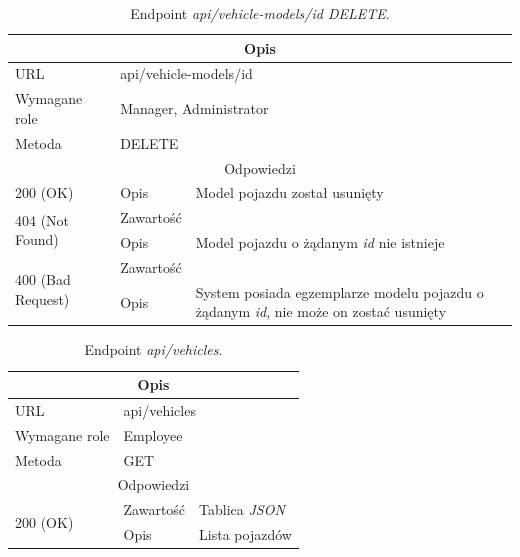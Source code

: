 \documentclass[eng,printmode,openany]{mgr}
\begin{document}
	\begin{table}[H]
		\caption{Endpoint \textit{api/vehicle-models/id DELETE}.}
		\begin{tabularx}{\textwidth}{|l|l|X|}
			\hline
			\multicolumn{3}{|c|}{Opis}
			\\ \hline
			URL                       & \multicolumn{2}{l|}{api/vehicle-models/id}
			\\ \hline
			Wymagane role             & \multicolumn{2}{l|}{Manager, Administrator}
			\\ \hline
			Metoda                    & \multicolumn{2}{l|}{DELETE}
			\\ \hline
			\multicolumn{3}{|c|}{Odpowiedzi}
			\\ \hline
			200 (OK)			                & Opis         	& Model pojazdu został usunięty
			\\ \hline
			\multirow{2}{*}{404 (Not Found)} 	& Zawartość     &    	
			\\ \cline{2-3}                      & Opis          & Model pojazdu o żądanym \textit{id} nie istnieje
			\\ \hline
			\multirow{2}{*}{400 (Bad Request)} 	& Zawartość     &    	
			\\ \cline{2-3}                      & Opis          & System posiada egzemplarze modelu pojazdu o żądanym \textit{id}, nie może on zostać usunięty
			\\ \hline
		\end{tabularx}
	\end{table}
	
	\newpage
	\begin{table}[H]
		\caption{Endpoint \textit{api/vehicles}.}
		\begin{tabularx}{\textwidth}{|l|l|X|}
			\hline
			\multicolumn{3}{|c|}{Opis}
			\\ \hline
			URL                         & \multicolumn{2}{l|}{api/vehicles}
			\\ \hline
			Wymagane role               & \multicolumn{2}{l|}{Employee}
			\\ \hline
			Metoda                      & \multicolumn{2}{l|}{GET}
			\\ \hline
			\multicolumn{3}{|c|}{ Odpowiedzi}
			\\ \hline
			\multirow{2}{*}{200 (OK)}   & Zawartość         & Tablica \textit{JSON}
			\\ \cline{2-3}              & Opis         	    & Lista pojazdów
			\\ \hline
		\end{tabularx}
	\end{table}
	
\end{document}
